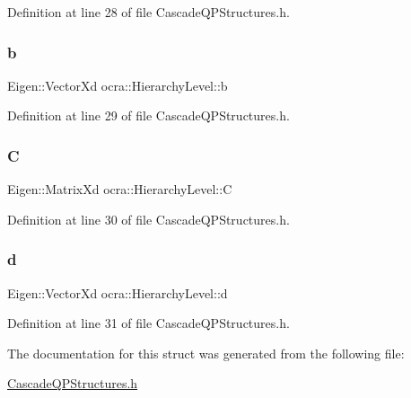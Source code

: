 Definition at line 28 of file Cascade\+Q\+P\+Structures.\+h.

\hypertarget{structocra_1_1HierarchyLevel_aedcf136bbf54aa0ff910b3a3ce3d43be}{}\label{structocra_1_1HierarchyLevel_aedcf136bbf54aa0ff910b3a3ce3d43be} 
\subsubsection{\texorpdfstring{b}{b}}
{\footnotesize\ttfamily Eigen\+::\+Vector\+Xd ocra\+::\+Hierarchy\+Level\+::b}



Definition at line 29 of file Cascade\+Q\+P\+Structures.\+h.

\hypertarget{structocra_1_1HierarchyLevel_ad33118f78c391492062c6b3687c2e20d}{}\label{structocra_1_1HierarchyLevel_ad33118f78c391492062c6b3687c2e20d} 
\subsubsection{\texorpdfstring{C}{C}}
{\footnotesize\ttfamily Eigen\+::\+Matrix\+Xd ocra\+::\+Hierarchy\+Level\+::C}



Definition at line 30 of file Cascade\+Q\+P\+Structures.\+h.

\hypertarget{structocra_1_1HierarchyLevel_ad1c6f525af33862743514fd5cf3e8c76}{}\label{structocra_1_1HierarchyLevel_ad1c6f525af33862743514fd5cf3e8c76} 
\subsubsection{\texorpdfstring{d}{d}}
{\footnotesize\ttfamily Eigen\+::\+Vector\+Xd ocra\+::\+Hierarchy\+Level\+::d}



Definition at line 31 of file Cascade\+Q\+P\+Structures.\+h.



The documentation for this struct was generated from the following file\+:\begin{DoxyCompactItemize}
\item 
\hyperlink{CascadeQPStructures_8h}{Cascade\+Q\+P\+Structures.\+h}\end{DoxyCompactItemize}
